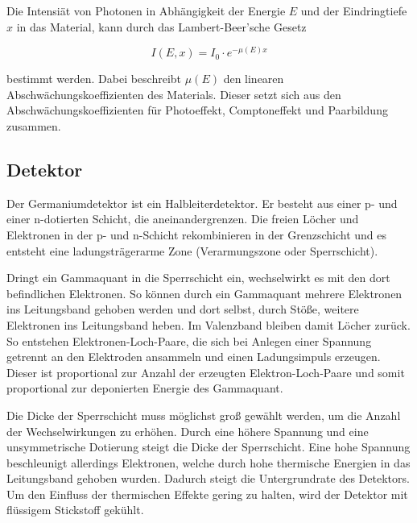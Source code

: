 Die Intensiät von Photonen in Abhängigkeit der Energie $E$ und der Eindringtiefe $x$ in das Material, kann durch das Lambert-Beer’sche Gesetz

\begin{equation}
  I(E,x) = I_0 \cdot e^{-\mu(E) x}
  \label{eqn:Lambert}
\end{equation}

bestimmt werden. Dabei beschreibt $\mu(E)$ den linearen Abschwächungskoeffizienten des Materials. Dieser setzt sich  aus den Abschwächungskoeffizienten für Photoeffekt, Comptoneffekt und Paarbildung zusammen.

\subsection{Detektor}

Der Germaniumdetektor ist ein Halbleiterdetektor. Er besteht aus einer p- und einer n-dotierten Schicht, die aneinandergrenzen.
Die freien Löcher und Elektronen in der p- und n-Schicht rekombinieren in der Grenzschicht und es entsteht eine ladungsträgerarme Zone (Verarmungszone oder Sperrschicht).

Dringt ein Gammaquant in die Sperrschicht ein, wechselwirkt es mit den dort befindlichen Elektronen.
So können durch ein Gammaquant mehrere Elektronen ins Leitungsband gehoben werden und dort selbst, durch Stöße, weitere Elektronen ins Leitungsband heben. Im Valenzband bleiben damit Löcher zurück.
So entstehen Elektronen-Loch-Paare, die sich bei Anlegen einer Spannung getrennt an den Elektroden ansammeln und einen Ladungsimpuls erzeugen.
Dieser ist proportional zur Anzahl der erzeugten Elektron-Loch-Paare und somit proportional zur deponierten Energie des Gammaquant.

Die Dicke der Sperrschicht muss möglichst groß gewählt werden, um die Anzahl der Wechselwirkungen zu erhöhen.
Durch eine höhere Spannung und eine unsymmetrische Dotierung steigt die Dicke der Sperrschicht.
Eine hohe Spannung beschleunigt allerdings Elektronen, welche durch hohe thermische
Energien in das Leitungsband gehoben wurden.
Dadurch steigt die Untergrundrate des Detektors.
Um den Einfluss der thermischen Effekte gering zu halten, wird der Detektor mit flüssigem Stickstoff gekühlt.

